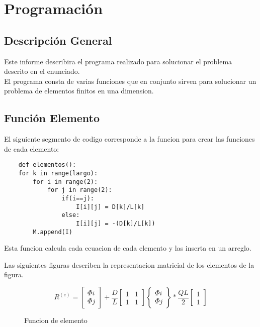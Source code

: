 \documentclass{article}
\begin{document}
\section{Programación}

\subsection{Descripción General}
Este informe describira el programa realizado para solucionar el problema descrito en el enunciado.\\
El programa consta de varias funciones que en conjunto sirven para solucionar un problema de elementos finitos en una dimension.
\newpage
\subsection{Función Elemento}
El siguiente segmento de codigo corresponde a la funcion para crear las funciones de cada elemento:
\begin{verbatim}
    def elementos():
    for k in range(largo):
        for i in range(2):
            for j in range(2):
                if(i==j):
                    I[i][j] = D[k]/L[k]
                else:
                    I[i][j] = -(D[k]/L[k])
        M.append(I)
\end{verbatim}
Esta funcion calcula cada ecuacion de cada elemento y las inserta en un arreglo.

Las siguientes figuras describen la representacion matricial de los elementos de la figura.
\begin{figure}[!h]
    \begin{equation}
        R^{(e)}=\left[ \begin{array}{cc}
            \Phi i  \\
            \Phi j
            \end{array}\right]+\frac{D}{L}
            \left[\begin{array}{cccc}
                1 & 1 \\
                1 & 1
                \end{array}
            \right]
            \left\lbrace \begin{array}{cc}
                \Phi i  \\
                \Phi j
                \end{array}\right\rbrace
                *
                \frac {QL}{2} \left[ \begin{array}{cccc}
                    1  \\
                    1
                    \end{array}\right]
        \end{equation}
        \caption{Funcion de elemento}
    \end{figure}
\end{document}
